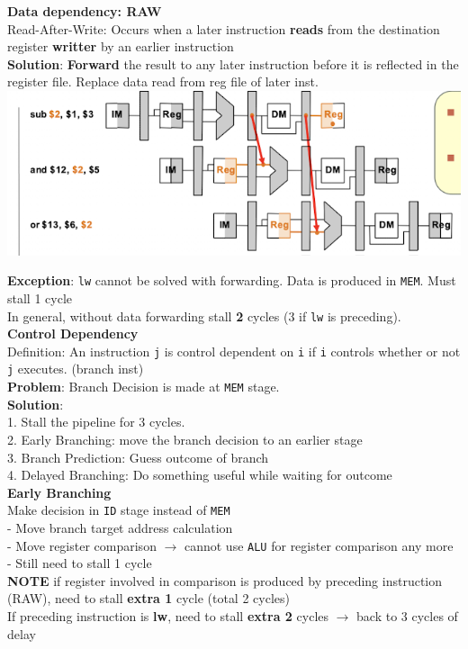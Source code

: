 \documentclass[10pt, a4paper]{article}
\newcommand{\highlight}[1]{{\color{red}\textbf{#1}}}
\begin{document}
\begin{multicols*}{3}
		\textbf{Data dependency: RAW}\\
		Read-After-Write: Occurs when a later instruction \highlight{reads} from the destination register \highlight{writter} by an earlier instruction\\
		\highlight{Solution}: \highlight{Forward} the result to any later instruction before it is reflected in the register file. Replace data read from reg file of later inst.\\
		\includegraphics[scale=.7]{./assets/dataForwarding}
		
		\highlight{Exception}: \texttt{lw} cannot be solved with forwarding. Data is produced in \texttt{MEM}. Must stall 1 cycle\\
		In general, without data forwarding stall \highlight{2} cycles (3 if \texttt{lw} is preceding).\\
		
		\textbf{Control Dependency}\\
		Definition: An instruction \texttt{j} is control dependent on \texttt{i} if \texttt{i} controls whether or not \texttt{j} executes. (branch inst)\\
		
		\highlight{Problem}: Branch Decision is made at \texttt{MEM} stage.\\
		\highlight{Solution}: \\
		1. Stall the pipeline for 3 cycles.\\
		2. Early Branching: move the branch decision to an earlier stage\\
		3. Branch Prediction: Guess outcome of branch\\
		4. Delayed Branching: Do something useful while waiting for outcome\\
		
		\textbf{Early Branching}\\
		Make decision in \texttt{ID} stage instead of \texttt{MEM}\\
		- Move branch target address calculation\\
		- Move register comparison $\rightarrow$ cannot use \texttt{ALU} for register comparison any more\\
		- Still need to stall 1 cycle\\
		\highlight{NOTE} if register involved in comparison is produced by preceding instruction (RAW), need to stall \highlight{extra 1} cycle (total 2 cycles)\\
		If preceding instruction is \highlight{lw}, need to stall \highlight{extra 2} cycles $\rightarrow$ back to 3 cycles of delay\\
		

\end{multicols*}
\end{document}
